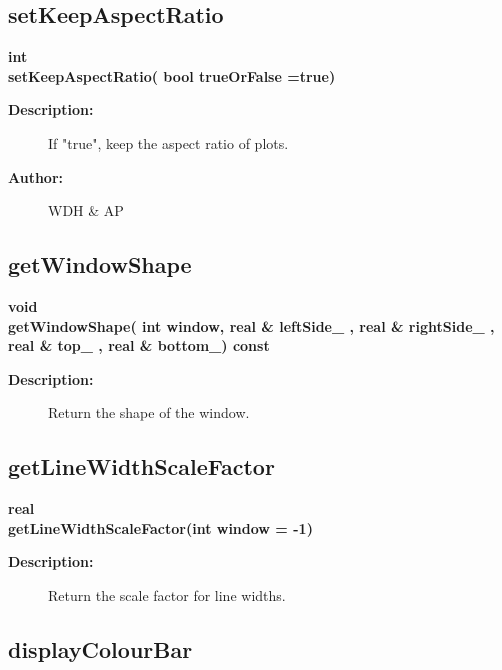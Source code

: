 \subsection{setKeepAspectRatio}
 
\begin{flushleft} \textbf{%
int   \\ 
\settowidth{\GLGraphicsInterfaceIncludeArgIndent}{setKeepAspectRatio(}%
setKeepAspectRatio( bool trueOrFalse  =true)
}\end{flushleft}
\begin{description}
\item[{\bf Description:}] 
     If "true", keep the aspect ratio of plots.
\item[{\bf Author:}]  WDH \& AP
\end{description}
\subsection{getWindowShape}
 
\begin{flushleft} \textbf{%
void  \\ 
\settowidth{\GLGraphicsInterfaceIncludeArgIndent}{getWindowShape(}%
getWindowShape( int window, real \& leftSide\_ , real \& rightSide\_ , real \& top\_ , real \& bottom\_) const
}\end{flushleft}
\begin{description}
\item[{\bf Description:}] 
    Return the shape of the window.
\end{description}
\subsection{getLineWidthScaleFactor}
 
\begin{flushleft} \textbf{%
real   \\ 
\settowidth{\GLGraphicsInterfaceIncludeArgIndent}{getLineWidthScaleFactor(}%
getLineWidthScaleFactor(int window  = -1)
}\end{flushleft}
\begin{description}
\item[{\bf Description:}] 
    Return the scale factor for line widths.
\end{description}
\subsection{displayColourBar}
 
